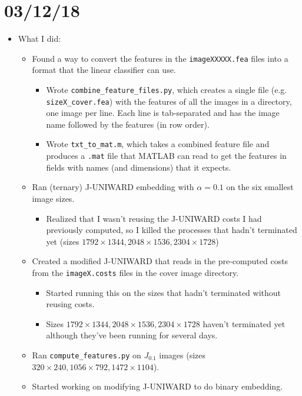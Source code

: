 \documentclass[11pt,a4paper]{report}
\begin{document}
\section{03/12/18}

\begin{itemize}

\item What I did:
  \begin{itemize}
  \item Found a way to convert the features in the \texttt{imageXXXXX.fea} files into a format that the linear classifier can use.
    \begin{itemize}
    \item Wrote \texttt{combine\_feature\_files.py}, which creates a single file (e.g. \texttt{sizeX\_cover.fea}) with the features of all the images in a directory, one image per line. Each line is tab-separated and has the image name followed by the features (in row order).
    \item Wrote \texttt{txt\_to\_mat.m}, which takes a combined feature file and produces a \texttt{.mat} file that MATLAB can read to get the features in fields with names (and dimensions) that it expects.
    \end{itemize}

  \item Ran (ternary) J-UNIWARD embedding with $\alpha = 0.1$ on the six smallest image sizes.
    \begin{itemize}
    \item Realized that I wasn't reusing the J-UNIWARD costs I had previously computed, so I killed the processes that hadn't terminated yet (sizes  $1792 \times 1344, 2048 \times 1536, 2304 \times 1728$)
    \end{itemize}

  \item Created a modified J-UNIWARD that reads in the pre-computed costs from the \texttt{imageX.costs} files in the cover image directory.
    \begin{itemize}
    \item Started running this on the sizes that hadn't terminated without reusing costs.
    \item Sizes $1792 \times 1344, 2048 \times 1536, 2304 \times 1728$ haven't terminated yet although they've been running for several days.
    \end{itemize}

  \item Ran \texttt{compute\_features.py} on $J_{0.1}$ images (sizes $320 \times 240, 1056 \times 792, 1472 \times 1104$).
  
  \item Started working on modifying J-UNIWARD to do binary embedding.
  \end{itemize}

\end{itemize}
\end{document}
